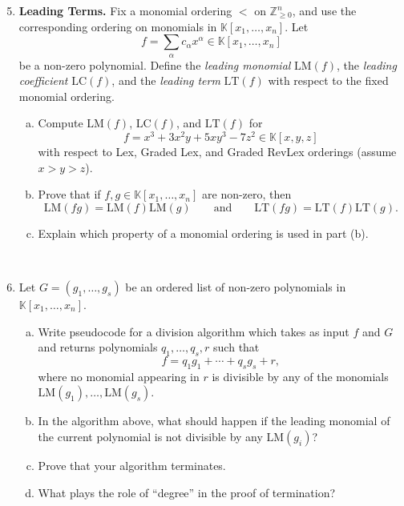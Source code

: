 \documentclass[12pt]{amsart}
\theoremstyle{definition}
\newcommand{\KK}{\mathbb{K}}
\newcommand{\ZZ}{\mathbb{Z}}
\begin{document}
\begin{enumerate}
\setcounter{enumi}{4}

\item  \textbf{Leading Terms.} Fix a monomial ordering $<$ on $\ZZ_{\geq 0}^n$, and use the corresponding ordering on monomials in $\KK[x_1,\ldots,x_n]$.
 Let
\[
f=\sum_{\alpha} c_\alpha x^\alpha \in \KK[x_1,\ldots,x_n]
\]
be a non-zero polynomial. Define the \emph{leading monomial} $\mathrm{LM}(f)$, the \emph{leading coefficient} $\mathrm{LC}(f)$, and the \emph{leading term} $\mathrm{LT}(f)$ with respect to the fixed monomial ordering.
\begin{enumerate}[(a)]
    \item Compute $\mathrm{LM}(f)$, $\mathrm{LC}(f)$, and $\mathrm{LT}(f)$ for
    \[
    f=x^3+3x^2y+5xy^3-7z^2 \in \KK[x,y,z]
    \]
    with respect to Lex, Graded Lex, and Graded RevLex orderings (assume $x>y>z$).
    
    \item Prove that if $f,g\in \KK[x_1,\ldots,x_n]$ are non-zero, then
    \[
    \mathrm{LM}(fg)=\mathrm{LM}(f)\mathrm{LM}(g)
    \qquad\text{and}\qquad
    \mathrm{LT}(fg)=\mathrm{LT}(f)\mathrm{LT}(g).
    \]
    
    \item Explain which property of a monomial ordering is used in part (b).
\end{enumerate}

\ \\

\item Let $G=(g_1,\ldots,g_s)$ be an ordered list of non-zero polynomials in $\KK[x_1,\ldots,x_n]$.
\begin{enumerate}[(a)]
    \item Write pseudocode for a division algorithm which takes as input $f$ and $G$ and returns polynomials $q_1,\ldots,q_s,r$ such that
    \[
    f=q_1g_1+\cdots+q_sg_s+r,
    \]
    where no monomial appearing in $r$ is divisible by any of the monomials $\mathrm{LM}(g_1),\ldots,\mathrm{LM}(g_s)$.
    
    \item In the algorithm above, what should happen if the leading monomial of the current polynomial is not divisible by any $\mathrm{LM}(g_i)$?
    
    \item Prove that your algorithm terminates.
    
    \item What plays the role of ``degree'' in the proof of termination?
\end{enumerate}


\end{enumerate}
\end{document}
